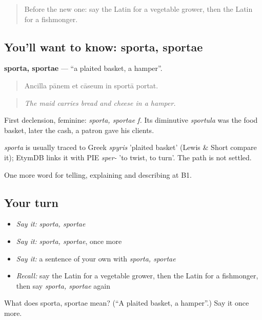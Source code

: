 \begin{quote}
Before the new one: say the Latin for a vegetable grower, then the Latin for a fishmonger.
\end{quote}

\subsection*{You'll want to know: sporta, sportae}
\textbf{sporta, sportae} — \textquotedblleft{}a plaited basket, a hamper\textquotedblright{}.

\begin{quote}
Ancilla pānem et cāseum in sportā portat.
\end{quote}

\begin{quote}
\emph{The maid carries bread and cheese in a hamper.}
\end{quote}

First declension, feminine: \emph{sporta, sportae f.} Its diminutive \emph{sportula} was the food basket, later the cash, a patron gave his clients.

\begin{cousinweb}
\emph{sporta} is usually traced to Greek \emph{spyris} 'plaited basket' (Lewis \& Short compare it); EtymDB links it with PIE \emph{sper-} 'to twist, to turn'. The path is not settled.
\end{cousinweb}

\begin{grammarlens}[title={What you've built}]
One more word for telling, explaining and describing at B1.
\end{grammarlens}

\subsection*{Your turn}
\begin{itemize}
\raggedright
  \item \emph{Say it:} \emph{sporta, sportae}
  \item \emph{Say it:} \emph{sporta, sportae}, once more
  \item \emph{Say it:} a sentence of your own with \emph{sporta, sportae}
  \item \emph{Recall:} say the Latin for a vegetable grower, then the Latin for a fishmonger, then say \emph{sporta, sportae} again
\end{itemize}

\begin{tcolorbox}[breakable,colback=teal!4,colframe=teal!35!black,title={Before you move on}]
What does sporta, sportae mean? (\textquotedblleft{}A plaited basket, a hamper\textquotedblright{}.) Say it once more.
\end{tcolorbox}
